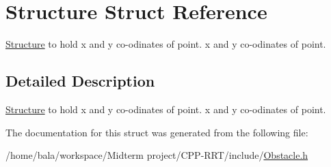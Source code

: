 \hypertarget{structStructure}{}\section{Structure Struct Reference}
\label{structStructure}


\hyperlink{structStructure}{Structure} to hold x and y co-\/odinates of point. x and y co-\/odinates of point.  




\subsection{Detailed Description}
\hyperlink{structStructure}{Structure} to hold x and y co-\/odinates of point. x and y co-\/odinates of point. 

The documentation for this struct was generated from the following file\+:\begin{DoxyCompactItemize}
\item 
/home/bala/workspace/\+Midterm project/\+C\+P\+P-\/\+R\+R\+T/include/\hyperlink{Obstacle_8h}{Obstacle.\+h}\end{DoxyCompactItemize}
